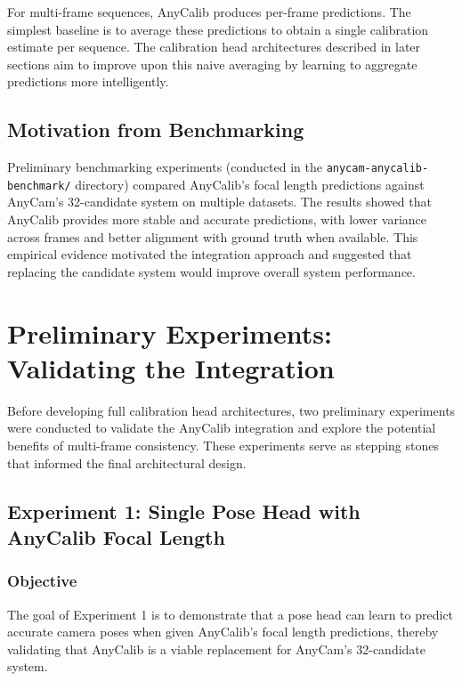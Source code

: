 For multi-frame sequences, AnyCalib produces per-frame predictions. The simplest baseline is to average these predictions to obtain a single calibration estimate per sequence. The calibration head architectures described in later sections aim to improve upon this naive averaging by learning to aggregate predictions more intelligently.

\subsection{Motivation from Benchmarking}

Preliminary benchmarking experiments (conducted in the \texttt{anycam-anycalib-benchmark/} directory) compared AnyCalib's focal length predictions against AnyCam's 32-candidate system on multiple datasets. The results showed that AnyCalib provides more stable and accurate predictions, with lower variance across frames and better alignment with ground truth when available. This empirical evidence motivated the integration approach and suggested that replacing the candidate system would improve overall system performance.

\section{Preliminary Experiments: Validating the Integration}\label{sec:preliminary-experiments}

Before developing full calibration head architectures, two preliminary experiments were conducted to validate the AnyCalib integration and explore the potential benefits of multi-frame consistency. These experiments serve as stepping stones that informed the final architectural design.

\subsection{Experiment 1: Single Pose Head with AnyCalib Focal Length}\label{sec:experiment-1}

\subsubsection{Objective}

The goal of Experiment 1 is to demonstrate that a pose head can learn to predict accurate camera poses when given AnyCalib's focal length predictions, thereby validating that AnyCalib is a viable replacement for AnyCam's 32-candidate system.

